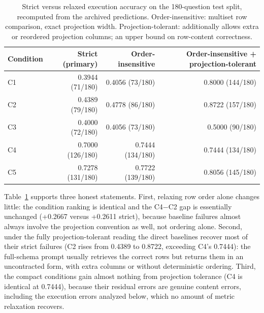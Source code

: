 \documentclass{ieeeaccess}
\begin{document}
\begin{table}[t]
\caption{Strict versus relaxed execution accuracy on the 180-question test split, recomputed from the archived predictions. Order-insensitive: multiset row comparison, exact projection width. Projection-tolerant: additionally allows extra or reordered projection columns; an upper bound on row-content correctness.}
\label{tab:relaxed-metrics}
\centering
\small
\begin{tabular*}{\textwidth}{@{\extracolsep{\fill}}lrrr}
\toprule
Condition & Strict (primary) & Order-insensitive & Order-insensitive + projection-tolerant \\
\midrule
C1 & 0.3944 (71/180) & 0.4056 (73/180) & 0.8000 (144/180) \\
C2 & 0.4389 (79/180) & 0.4778 (86/180) & 0.8722 (157/180) \\
C3 & 0.4000 (72/180) & 0.4056 (73/180) & 0.5000 (90/180) \\
C4 & 0.7000 (126/180) & 0.7444 (134/180) & 0.7444 (134/180) \\
C5 & 0.7278 (131/180) & 0.7722 (139/180) & 0.8056 (145/180) \\
\bottomrule
\end{tabular*}
\end{table}

Table~\ref{tab:relaxed-metrics} supports three honest statements. First, relaxing row order alone changes little: the condition ranking is identical and the C4$-$C2 gap is essentially unchanged (+0.2667 versus +0.2611 strict), because baseline failures almost always involve the projection convention as well, not ordering alone. Second, under the fully projection-tolerant reading the direct baselines recover most of their strict failures (C2 rises from 0.4389 to 0.8722, exceeding C4's 0.7444): the full-schema prompt usually retrieves the correct rows but returns them in an uncontracted form, with extra columns or without deterministic ordering. Third, the compact conditions gain almost nothing from projection tolerance (C4 is identical at 0.7444), because their residual errors are genuine content errors, including the execution errors analyzed below, which no amount of metric relaxation recovers.
\end{document}

